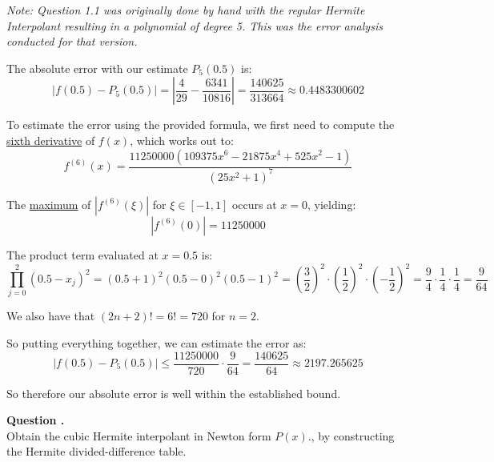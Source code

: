 \documentclass[12pt]{article}
\newcounter{question}
\newcounter{subquest}
\newcommand{\subquestion}[1][true]{
    \stepcounter{subquest} 
    \ifthenelse{\equal{#1}{true} \and \value{subquest}>1}{\newpage}{}
    \vspace{1em}
    \textbf{\large Question \thequestion.\thesubquest}
    \vspace{.5em}\ \\}
\begin{document}

\emph{Note: Question 1.1 was originally done by hand with the regular Hermite Interpolant resulting in a polynomial of degree 5. This was the error analysis conducted for that version.}

The absolute error with our estimate $P_5(0.5)$ is:
\[|f(0.5)-P_5(0.5)| = \left|\frac{4}{29} - \frac{6341}{10816}\right| = \frac{140625}{313664} \approx 0.4483300602\]

To estimate the error using the provided formula, we first need to compute the \href{https://www.derivative-calculator.net/}{sixth derivative} of $f(x)$, which works out to:
\[f^{(6)}(x) = \frac{11250000 \left(109375x^{6} - 21875x^{4} + 525x^{2} - 1\right)}{\left(25x^{2} + 1\right)^{7}}\]


The \href{https://www.wolframalpha.com/input?i=maximum+calculator&assumption=%7B%22F%22%2C+%22GlobalMaximizeCalculator%22%2C+%22curvefunction%22%7D+-%3E%22abs%2811250000%28109375x%5E6-21875x%5E4%2B525x%5E2-1%29%2F%28%2825x%5E2%2B1%29%5E7%29%29%22&assumption=%7B%22F%22%2C+%22GlobalMaximizeCalculator%22%2C+%22domain%22%7D+-%3E%22-1+%3C%3D+x+%3C%3D+1%22}{maximum} of $|f^{(6)}(\xi)|$ for $\xi \in [-1,1]$ occurs at $x=0$, yielding:
\[|f^{(6)}(0)| = 11250000\]

The product term evaluated at $x=0.5$ is:
\[\prod_{j=0}^{2}(0.5 - x_j)^2 = (0.5 + 1)^2 (0.5 - 0)^2 (0.5 - 1)^2 = \left(\frac{3}{2}\right)^2 \cdot \left(\frac{1}{2}\right)^2 \cdot \left(-\frac{1}{2}\right)^2 = \frac{9}{4} \cdot \frac{1}{4} \cdot \frac{1}{4} = \frac{9}{64}\]

We also have that $(2n+2)! = 6! = 720$ for $n=2$.

So putting everything together, we can estimate the error as:
\[\left|f(0.5)-P_5(0.5)\right| \leq \frac{11250000}{720} \cdot \frac{9}{64} = \frac{140625}{64} \approx 2197.265625\]

So therefore our absolute error is well within the established bound.

\subquestion
Obtain the cubic Hermite interpolant in Newton form $P(x)$., by constructing the Hermite divided-difference table.
\end{document}
